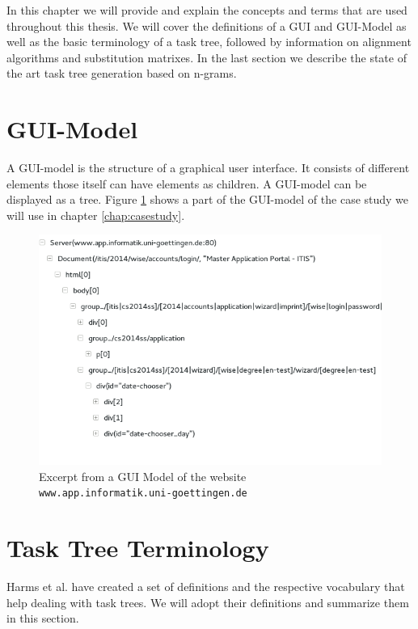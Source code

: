 In this chapter we will provide and explain the concepts and terms that are used throughout this thesis.
We will cover the definitions of a GUI and GUI-Model as well as the basic terminology of a task tree, followed by
 information on alignment algorithms and substitution matrixes.
In the last section we describe the state of the art task tree generation based on n-grams\cite{harms2013}.


\section{GUI-Model}
\label{sec:foundationguiandguimodel}
A GUI-model is the structure of a graphical user interface. It consists of different elements those itself can have elements as children.
A GUI-model can be displayed as a tree. Figure \ref{fig:guimodel} shows a part of the GUI-model of the case study we will use in chapter \ref{chap:casestudy}.
\begin{figure}
	\includegraphics[width=\textwidth]{chapters/foundations/guimodel.png}
	\caption{Excerpt from a GUI Model of the website \texttt{www.app.informatik.uni-goettingen.de}}
	\label{fig:guimodel}
\end{figure}


\section{Task Tree Terminology}
\label{sec:foundationtasktreeterminology}
Harms et al.\cite{harms2013} have created a set of definitions and the respective vocabulary that help dealing with task trees.
We will adopt their definitions and summarize them in this section.


